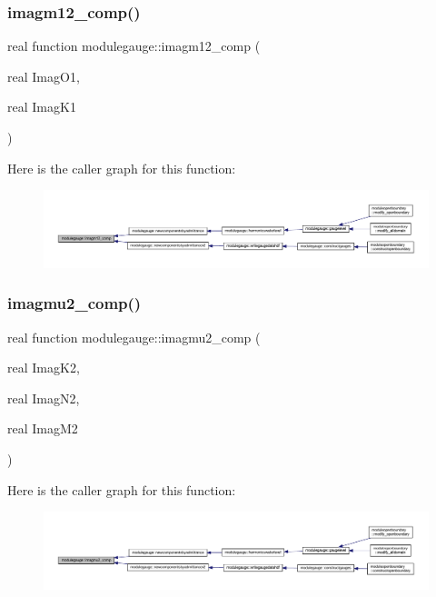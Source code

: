 \subsubsection{\texorpdfstring{imagm12\+\_\+comp()}{imagm12\_comp()}}
{\footnotesize\ttfamily real function modulegauge\+::imagm12\+\_\+comp (\begin{DoxyParamCaption}\item[{real}]{Imag\+O1,  }\item[{real}]{Imag\+K1 }\end{DoxyParamCaption})\hspace{0.3cm}{\ttfamily [private]}}

Here is the caller graph for this function\+:\nopagebreak
\begin{figure}[H]
\begin{center}
\leavevmode
\includegraphics[width=350pt]{namespacemodulegauge_aa6945b552551befe5db497d61883c814_icgraph}
\end{center}
\end{figure}
\mbox{\label{namespacemodulegauge_acb26f834d34705945913d60c75c3ce71}} 
\subsubsection{\texorpdfstring{imagmu2\+\_\+comp()}{imagmu2\_comp()}}
{\footnotesize\ttfamily real function modulegauge\+::imagmu2\+\_\+comp (\begin{DoxyParamCaption}\item[{real}]{Imag\+K2,  }\item[{real}]{Imag\+N2,  }\item[{real}]{Imag\+M2 }\end{DoxyParamCaption})\hspace{0.3cm}{\ttfamily [private]}}

Here is the caller graph for this function\+:\nopagebreak
\begin{figure}[H]
\begin{center}
\leavevmode
\includegraphics[width=350pt]{namespacemodulegauge_acb26f834d34705945913d60c75c3ce71_icgraph}
\end{center}
\end{figure}
\mbox{\label{namespacemodulegauge_a63b14124c79ff7d860721610832a3ef5}} 
